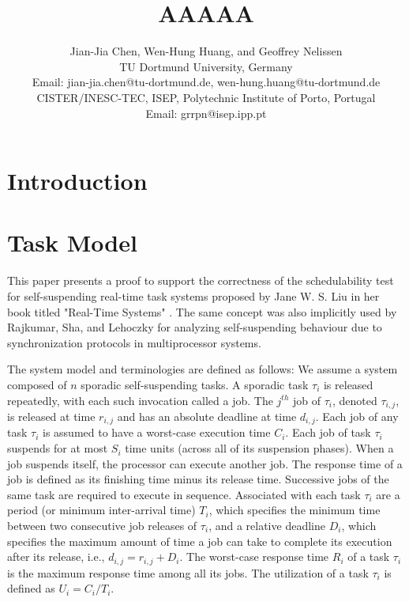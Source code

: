 \documentclass[10pt,conference]{IEEEtran}
\begin{document}
\title{AAAAA}

\author{Jian-Jia Chen, Wen-Hung Huang, and Geoffrey Nelissen\\
TU Dortmund University, Germany\\
Email: jian-jia.chen@tu-dortmund.de, wen-hung.huang@tu-dortmund.de\\
CISTER/INESC-TEC, ISEP, Polytechnic Institute of Porto, Portugal \\
Email: grrpn@isep.ipp.pt
}

\maketitle
\section{Introduction}

\section{Task Model}

This paper presents a proof to support the correctness of the
schedulability test for self-suspending real-time task systems proposed by Jane
W. S. Liu in her book titled "Real-Time Systems" \cite[Pages 164-165]{Liu:2000:RS:518501}.
The same concept was also implicitly used by Rajkumar, Sha, and Lehoczky \cite[Page 267]{DBLP:conf/rtss/RajkumarSL88} for analyzing self-suspending behaviour due to synchronization protocols in multiprocessor systems. 


The system model and terminologies are defined as follows: We assume a system composed of $n$ sporadic self-suspending tasks. A sporadic task $\tau_i$ is released repeatedly, with each such invocation called a
job. The $j^{th}$ job of $\tau_i$, denoted $\tau_{i,j}$, is released
at time $r_{i,j}$ and has an absolute deadline at time $d_{i,j}$. Each
job of any task $\tau_i$ is assumed to have a worst-case execution time $C_i$. Each job of task $\tau_i$ 
suspends for at most $S_i$ time units (across all of its suspension phases). When a job suspends itself, 
the processor can execute another job. 
The response time
of a job is defined as its finishing time minus its release
time. Successive jobs of the same task are required to execute in
sequence. Associated with each task $\tau_i$ are a period (or minimum inter-arrival time) $T_i$, which
specifies the minimum time between two consecutive job releases of
$\tau_i$, and a relative deadline $D_i$, which specifies the maximum amount of time a job can take to complete its execution after its release, i.e., $d_{i,j}=r_{i,j}+D_i$. The worst-case response
time $R_i$ of a task $\tau_i$ is the maximum response time among all its
jobs.  The utilization of a task $\tau_i$ is defined as $U_i=C_i/T_i$.
\end{document}
